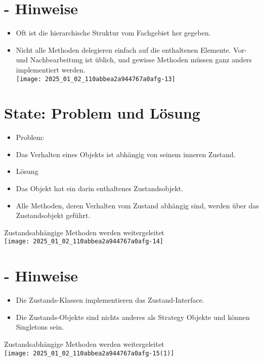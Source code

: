 \documentclass[10pt]{article}
\begin{document}
\section*{- Hinweise}
\begin{itemize}
  \item Oft ist die hierarchische Struktur vom Fachgebiet her gegeben.
  \item Nicht alle Methoden delegieren einfach auf die enthaltenen Elemente. Vor- und Nachbearbeitung ist üblich, und gewisse Methoden müssen ganz anders implementiert werden.\\
\texttt{[image: 2025\_01\_02\_110abbea2a944767a0afg-13]}
\end{itemize}

\section*{State: Problem und Lösung}
\begin{itemize}
  \item Problem:
  \item Das Verhalten eines Objekts ist abhängig von seinem inneren Zustand.
  \item Lösung
  \item Das Objekt hat ein darin enthaltenes Zustandsobjekt.
  \item Alle Methoden, deren Verhalten vom Zustand abhängig sind, werden über das Zustandsobjekt geführt.
\end{itemize}

Zustandsabhängige Methoden werden weitergeleitet\\
\texttt{[image: 2025\_01\_02\_110abbea2a944767a0afg-14]}

\section*{- Hinweise}
\begin{itemize}
  \item Die Zustands-Klassen implementieren das Zustand-Interface.
  \item Die Zustands-Objekte sind nichts anderes als Strategy Objekte und können Singletons sein.
\end{itemize}

Zustandsabhängige Methoden werden weitergeleitet\\
\texttt{[image: 2025\_01\_02\_110abbea2a944767a0afg-15(1)]}
\end{document}
